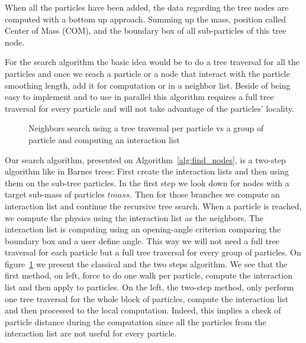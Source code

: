 When all the particles have been added, the data regarding the tree nodes are computed with a bottom up approach. 
Summing up the mass, position called Center of Mass (COM), and the boundary box of all sub-particles of this tree node.

For the search algorithm the basic idea would be to do a tree traversal for all the particles and once we reach a particle or a node that interact with the particle smoothing length, add it for computation or in a neighbor list. 
Beside of being easy to implement and to use in parallel this algorithm requires a full tree traversal for every particle and will not take advantage of the particles' locality.

\begin{figure}[ht!]
\centering

\caption{Neighbors search using a tree traversal per particle vs a group of particle and computing an interaction list}
\label{fig:arbre}
\end{figure}

Our search algorithm, presented on Algorithm~\ref{alg:find_nodes}, is a two-step algorithm like in Barnes trees: First create the interaction lists and then using them on the sub-tree particles. 
In the first step we look down for nodes with a target sub-mass of particles $tmass$. 
Then for those branches we compute an interaction list and continue the recursive tree search. 
When a particle is reached, we compute the physics using the interaction list as the neighbors. 
The interaction list is computing using an opening-angle criterion comparing the boundary box and a user define angle. 
This way we will not need a full tree traversal for each particle but a full tree traversal for every group of particles.
On figure~\ref{fig:arbre} we present the classical and the two steps algorithm. 
We see that the first method, on left, force to do one walk per particle, compute the interaction list and then apply to particles. 
On the left, the two-step method, only perform one tree traversal for the whole block of particles, compute the interaction list and then processed to the local computation. 
Indeed, this implies a check of particle distance during the computation since all the particles from the interaction list are not useful for every particle. 

